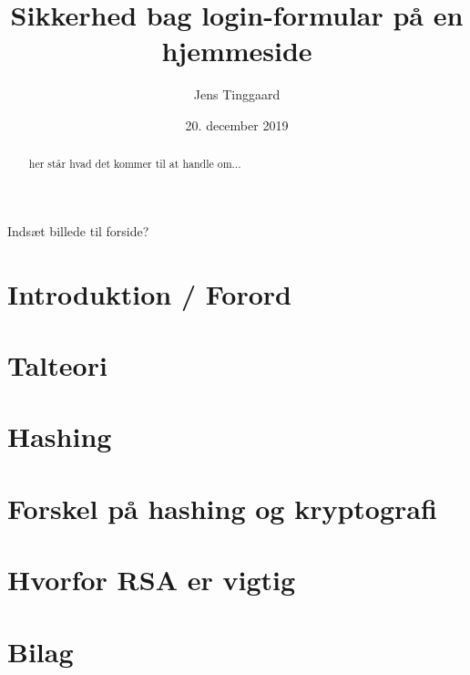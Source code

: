 \documentclass[a4paper, 12pt]{article}
\date{20. december 2019}
\title{Sikkerhed bag login-formular på en hjemmeside}
\author{Jens Tinggaard}
\theoremstyle{break}
\theoremstyle{breakline}
\begin{document}
\clearpage\maketitle
\thispagestyle{empty}
\maketitle

\begin{abstract} %
her står hvad det kommer til at handle om...
\end{abstract}

Indsæt billede til forside?


\newpage
\tableofcontents


\newpage
\section*{Introduktion / Forord}



\newpage
\section{Talteori}



\newpage
\section{Hashing}



\newpage
\section{Forskel på hashing og kryptografi}



\newpage
\section{Hvorfor RSA er vigtig}





\newpage
\nocite{*}
\setlength\bibitemsep{10pt}
\printbibliography[
heading=bibintoc, %
title={Litteratur} %
]

\newpage
\section{Bilag}

\end{document}
